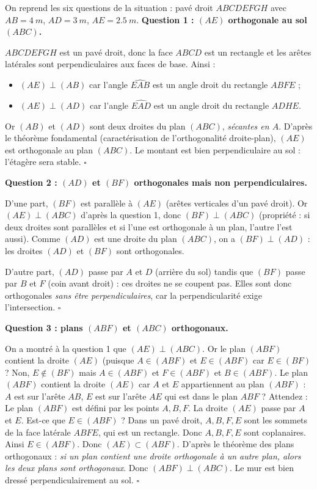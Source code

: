 \documentclass[11pt]{article}
\newcommand{\cle}[1]{{\popxbold\color{popdark}#1}}
\newcounter{popsec}
\newcounter{popsub}
\newcommand{\courssub}[1]{%
  \stepcounter{popsub}%
  \par\vspace{9pt}\noindent{\popxbold\fontsize{11.5}{13}\selectfont\color{popink}{\color{poporange}\thepopsec.\thepopsub}\hspace{6pt}#1}\par\nopagebreak\vspace{4pt}
}
\begin{document}
\courssub{Démarche et corrigé commenté}

\begin{exoresolu}
On reprend les six questions de la situation : pavé droit $ABCDEFGH$ avec $AB = \SI{4}{m}$, $AD = \SI{3}{m}$, $AE = \SI{2,5}{m}$.
\tcblower
\textbf{Question 1 : $(AE)$ orthogonale au sol $(ABC)$.}

$ABCDEFGH$ est un pavé droit, donc la face $ABCD$ est un rectangle et les arêtes latérales sont perpendiculaires aux faces de base. Ainsi :
\begin{itemize}
\item $(AE) \perp (AB)$ car l'angle $\widehat{EAB}$ est un angle droit du rectangle $ABFE$ ;
\item $(AE) \perp (AD)$ car l'angle $\widehat{EAD}$ est un angle droit du rectangle $ADHE$.
\end{itemize}
Or $(AB)$ et $(AD)$ sont deux droites du plan $(ABC)$, \emph{sécantes en $A$}. D'après le théorème fondamental (caractérisation de l'orthogonalité droite-plan), $(AE)$ est orthogonale au plan $(ABC)$. Le montant est bien perpendiculaire au sol : l'étagère sera stable. $\square$

\medskip
\textbf{Question 2 : $(AD)$ et $(BF)$ orthogonales mais non perpendiculaires.}

D'une part, $(BF)$ est parallèle à $(AE)$ (arêtes verticales d'un pavé droit). Or $(AE) \perp (ABC)$ d'après la question 1, donc $(BF) \perp (ABC)$ (propriété : si deux droites sont parallèles et si l'une est orthogonale à un plan, l'autre l'est aussi). Comme $(AD)$ est une droite du plan $(ABC)$, on a $(BF) \perp (AD)$ : les droites $(AD)$ et $(BF)$ sont \cle{orthogonales}.

D'autre part, $(AD)$ passe par $A$ et $D$ (arrière du sol) tandis que $(BF)$ passe par $B$ et $F$ (coin avant droit) : ces droites ne se coupent pas. Elles sont donc orthogonales \emph{sans être perpendiculaires}, car la perpendicularité exige l'intersection. $\square$

\medskip
\textbf{Question 3 : plans $(ABF)$ et $(ABC)$ orthogonaux.}

On a montré à la question 1 que $(AE) \perp (ABC)$. Or le plan $(ABF)$ contient la droite $(AE)$ (puisque $A \in (ABF)$ et $E \in (ABF)$ car $E \in (BF)$ ? Non, $E \notin (BF)$ mais $A \in (ABF)$ et $F \in (ABF)$ et $B \in (ABF)$. Le plan $(ABF)$ contient la droite $(AE)$ car $A$ et $E$ appartiennent au plan $(ABF)$ : $A$ est sur l'arête $AB$, $E$ est sur l'arête $AE$ qui est dans le plan $ABF$ ? Attendez : Le plan $(ABF)$ est défini par les points $A, B, F$. La droite $(AE)$ passe par $A$ et $E$. Est-ce que $E \in (ABF)$ ? Dans un pavé droit, $A, B, F, E$ sont les sommets de la face latérale $ABFE$, qui est un rectangle. Donc $A, B, F, E$ sont coplanaires. Ainsi $E \in (ABF)$. Donc $(AE) \subset (ABF)$.
D'après le théorème des plans orthogonaux : \emph{si un plan contient une droite orthogonale à un autre plan, alors les deux plans sont orthogonaux}. Donc $(ABF) \perp (ABC)$. Le mur est bien dressé perpendiculairement au sol. $\square$


\end{exoresolu}
\end{document}
